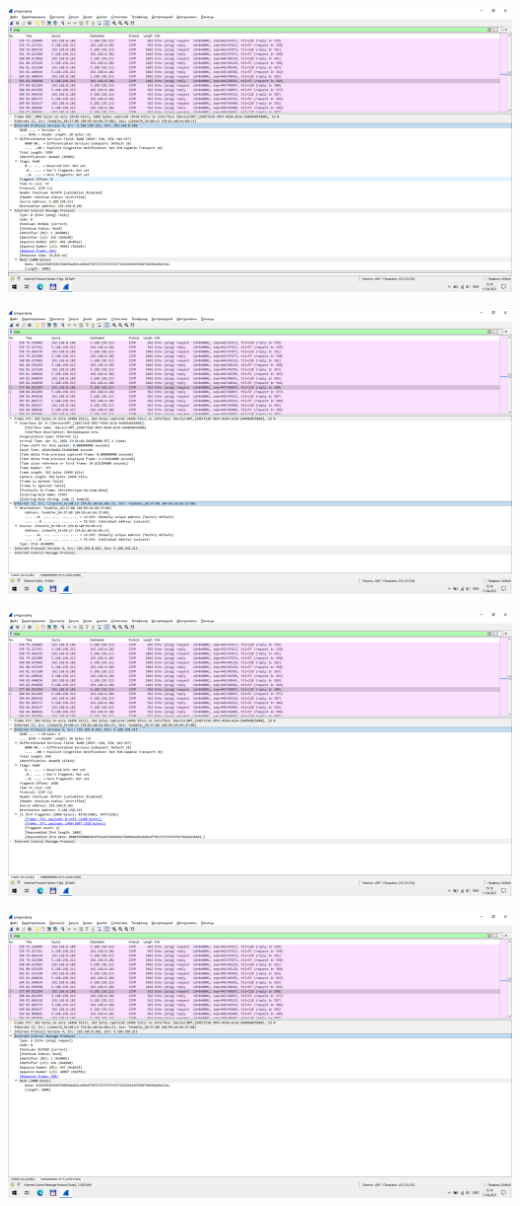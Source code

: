 \begin{center}
    \includegraphics[width=\textwidth]{screenshots/ping_1000_response_2}

    \includegraphics[width=\textwidth]{screenshots/ping_2000_request_1}

    \includegraphics[width=\textwidth]{screenshots/ping_2000_request_2}

    \includegraphics[width=\textwidth]{screenshots/ping_2000_request_3}


\end{center}
